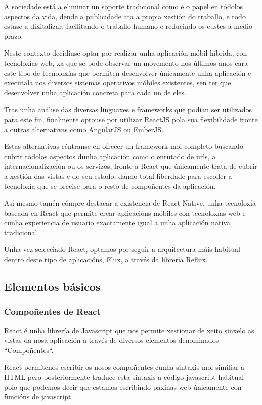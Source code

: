     A sociedade está a eliminar un soporte tradicional como é o papel en 
tódolos aspectos da vida, dende a publicidade ata a propia xestión do traballo, 
e todo estase a dixitalizar, facilitando o traballo humano e reducindo os custes 
a medio prazo.

    Neste contexto decidíuse optar por realizar unha aplicación móbil 
híbrida, con tecnoloxías web, xa que se pode observar un movemento nos últimos 
anos cara este tipo de tecnoloxías que permiten desenvolver únicamente unha 
aplicación e executala nos diversos sistemas operativos móbiles existentes, sen 
ter que desenvolver unha aplicación concreta para cada un de eles.

    Tras unha análise das diversas linguaxes e frameworks que podían 
ser utilizados para este fin, finalmente optouse por utilizar ReactJS pola sua 
flexibilidade fronte a outras alternativas como AngularJS ou EmberJS.

    Estas alternativas céntranse en ofrecer un framework moi completo buscando 
cubrir tódolos aspectos dunha aplicación como o enrutado 
de urls, a internacionalización ou os servizos, fronte a React que únicamente 
trata de cubrir a xestión das vistas e do seu estado, dando total liberdade 
para escoller a tecnoloxía que se precise para o resto de compoñentes da 
aplicación.

    Así mesmo tamén cómpre destacar a existencia de React 
Native\cite{book:reactnative}, unha 
tecnoloxía baseada en React que permite crear aplicacións móbiles con 
tecnoloxías web e cunha experiencia de usuario exactamente igual a unha 
aplicación nativa tradicional.

    Unha vez selecciado React, optamos por seguir a arquitectura máis habitual 
dentro deste tipo de aplicacións, Flux, a través da librería Reflux.

    \subsection{Elementos básicos}
      \subsubsection{Compoñentes de React}
      React é unha librería de Javascript que nos permite xestionar de xeito 
sinxelo as vistas da nosa aplicación a través de diversos elementos denominados 
``Compoñentes``.

      React permítenos escribir os nosos compoñentes cunha sintaxis moi 
similiar a HTML pero posteriormente traduce esta sintaxis a código javascript 
habitual polo que podemos decir que estamos escribindo páxinas web únicamente 
con funcións de javascript.

